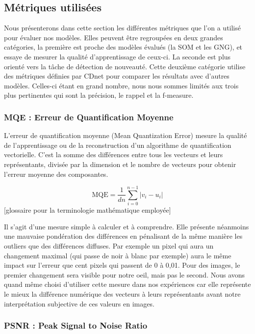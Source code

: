 	\subsection{Métriques utilisées}

	Nous présenterons dans cette section les différentes métriques que l'on a utilisé pour évaluer nos modèles. Elles peuvent être regroupées en deux grandes catégories, la première est proche des modèles évalués (la SOM et les GNG), et essaye de mesurer la qualité d'apprentissage de ceux-ci. La seconde est plus orienté vers la tâche de détection de nouveauté. Cette deuxième catégorie utilise des métriques définies par CDnet pour comparer les résultats avec d'autres modèles. Celles-ci étant en grand nombre, nous nous sommes limités aux trois plus pertinentes qui sont la précision, le rappel et la f-measure.

	\subsubsection{MQE : Erreur de Quantification Moyenne}

	L'erreur de quantification moyenne (Mean Quantization Error) mesure la qualité de l'apprentissage ou de la reconstruction d'un algorithme de quantification vectorielle. C'est la somme des différences entre tous les vecteurs et leurs représentants, divisée par la dimension et le nombre de vecteurs pour obtenir l'erreur moyenne des composantes.
	
	\begin{equation}
		\text{MQE} = \frac{1}{dn} \sum_{i=0}^{n-1} |v_i - u_i|
	\end{equation}
	[glossaire pour la terminologie mathématique employée]

	Il s'agit d'une mesure simple à calculer et à comprendre. Elle présente néanmoins une mauvaise pondération des différences en pénalisant de la même manière les outliers que des différences diffuses. Par exemple un pixel qui aura un changement maximal (qui passe de noir à blanc par exemple) aura le même impact sur l'erreur que cent pixels qui passent de 0 à 0,01. Pour des images, le premier changement sera visible pour notre oeil, mais pas le second. Nous avons quand même choisi d'utiliser cette mesure dans nos expériences car elle représente le mieux la différence numérique des vecteurs à leurs représentants avant notre interprétation subjective de ces valeurs en images.

	\subsubsection{PSNR : Peak Signal to Noise Ratio}

